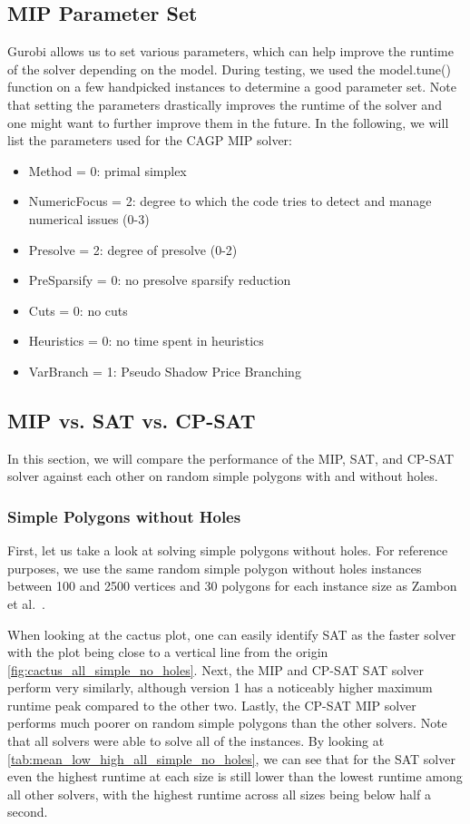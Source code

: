 \subsection{MIP Parameter Set}
Gurobi allows us to set various parameters, which can help improve the runtime of the solver depending on the model. During testing, we used the model.tune() function on a few handpicked instances to determine a good parameter set. Note that setting the parameters drastically improves the runtime of the solver and one might want to further improve them in the future. In the following, we will list the parameters used for the CAGP MIP solver:
\begin{itemize}
  \item Method = 0: primal simplex
  \item NumericFocus = 2: degree to which the code tries to detect and manage numerical issues (0-3)
  \item Presolve = 2: degree of presolve (0-2)
  \item PreSparsify = 0: no presolve sparsify reduction
  \item Cuts = 0: no cuts
  \item Heuristics = 0: no time spent in heuristics
  \item VarBranch = 1: Pseudo Shadow Price Branching
\end{itemize}

\subsection{MIP vs. SAT vs. CP-SAT}
In this section, we will compare the performance of the MIP, SAT, and CP-SAT solver against each other on random simple polygons with and without holes.

\subsubsection{Simple Polygons without Holes}
First, let us take a look at solving simple polygons without holes.
For reference purposes, we use the same random simple polygon without holes instances between 100 and 2500 vertices and 30 polygons for each instance size as Zambon et al.~\cite{art-gallery-instances-page}.

When looking at the cactus plot, one can easily identify SAT as the faster solver with the plot being close to a vertical line from the origin \cref{fig:cactus_all_simple_no_holes}. Next, the MIP and CP-SAT SAT solver perform very similarly, although version 1 has a noticeably higher maximum runtime peak compared to the other two. Lastly, the CP-SAT MIP solver performs much poorer on random simple polygons than the other solvers. Note that all solvers were able to solve all of the instances. By looking at \cref{tab:mean_low_high_all_simple_no_holes}, we can see that for the SAT solver even the highest runtime at each size is still lower than the lowest runtime among all other solvers, with the highest runtime across all sizes being below half a second.

